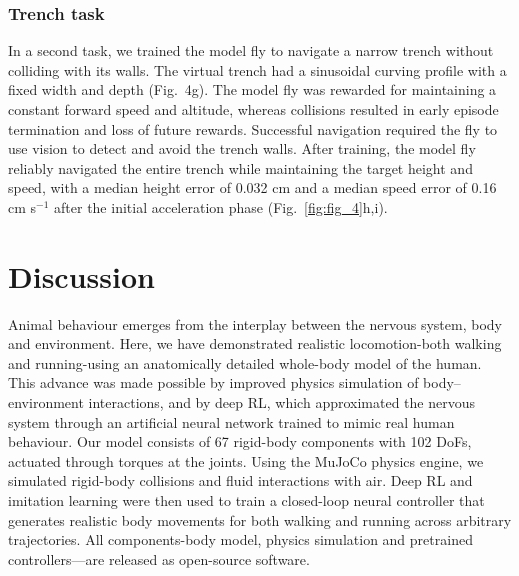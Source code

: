 \documentclass[sn-mathphys-num]{sn-jnl}%
\theoremstyle{thmstyleone}%
\theoremstyle{thmstyletwo}%
\theoremstyle{thmstylethree}%
\begin{document}
\subsubsection{Trench task}

In a second task, we trained the model fly to navigate a narrow trench without colliding with its walls. 
The virtual trench had a sinusoidal curving profile with a fixed width and depth (Fig. 4g). 
The model fly was rewarded for maintaining a constant forward speed and altitude, whereas collisions resulted in early episode termination and loss of future rewards. 
Successful navigation required the fly to use vision to detect and avoid the trench walls. 
After training, the model fly reliably navigated the entire trench while maintaining the target height and speed, with a median height error of 0.032 cm and a median speed error of 0.16 cm s$ ^{-1} $ after the initial acceleration phase (Fig.~\ref{fig:fig_4}h,i).







\section{Discussion}

Animal behaviour emerges from the interplay between the nervous system, body and environment. 
Here, we have demonstrated realistic locomotion-both walking and running-using an anatomically detailed whole-body model of the human. 
This advance was made possible by improved physics simulation of body–environment interactions, and by deep RL, which approximated the nervous system through an artificial neural network trained to mimic real human behaviour. 
Our model consists of 67 rigid-body components with 102 DoFs, actuated through torques at the joints. 
Using the MuJoCo physics engine, we simulated rigid-body collisions and fluid interactions with air. 
Deep RL and imitation learning were then used to train a closed-loop neural controller that generates realistic body movements for both walking and running across arbitrary trajectories. 
All components-body model, physics simulation and pretrained controllers—are released as open-source software.
\end{document}
